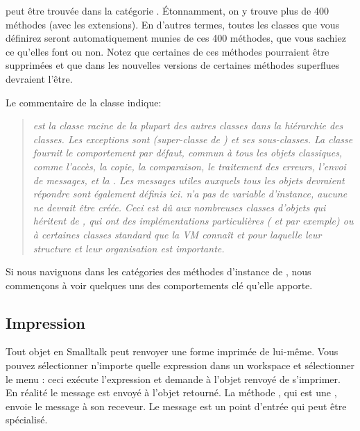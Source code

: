 \documentclass[a4paper,10pt,twoside]{book}
\begin{document}
 peut être trouvée dans la catégorie . Étonnamment, on y trouve plus de 400 méthodes (avec les extensions). En d'autres termes, toutes les classes que vous définirez seront automatiquement munies de ces 400 méthodes, que vous sachiez ce qu'elles font ou non. Notez que certaines de ces méthodes pourraient être supprimées et que dans les nouvelles versions de \squeak certaines méthodes superflues devraient l'être.

Le commentaire de la classe  indique:
\begin{quote}
\textit{ est la classe racine de la plupart des autres classes dans la hiérarchie des classes. Les exceptions sont  (super-classe de ) et ses sous-classes.
La classe  fournit le comportement par défaut, commun à tous les objets classiques, comme l'accès, la copie, la comparaison, le traitement des erreurs, l'envoi de messages, et la . Les messages utiles auxquels tous les objets devraient répondre sont également définis ici.
 n'a pas de variable d'instance, aucune ne devrait être créée. Ceci est dû aux nombreuses classes d'objets qui héritent de , qui ont des implémentations particulières ( et  par exemple) ou à certaines classes standard que la VM connaît et pour laquelle leur structure et leur organisation est importante.}
\end{quote}

Si nous naviguons dans les catégories des méthodes d'instance de , nous commençons à voir quelques uns des comportements clé qu'elle apporte.

\subsection{Impression}
Tout objet en Smalltalk peut renvoyer une forme imprimée de lui-même. Vous pouvez sélectionner n'importe quelle expression dans un workspace et sélectionner le menu : ceci exécute l'expression et demande à l'objet renvoyé de s'imprimer. En réalité le message  est envoyé à l'objet retourné. La méthode , qui est une , envoie le message  à son receveur. Le message  est un point d'entrée qui peut être spécialisé. 
\end{document}
